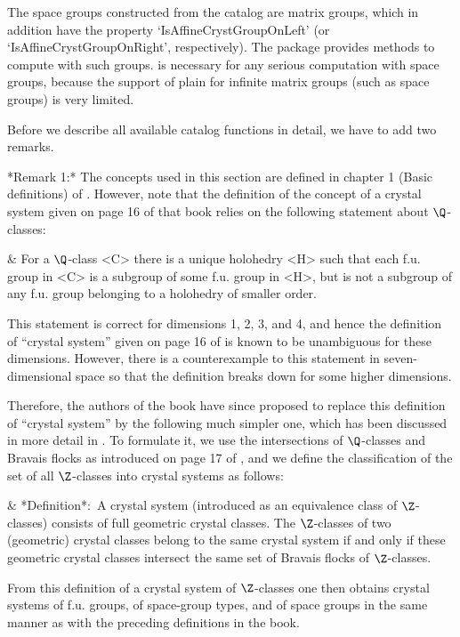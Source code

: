 The space groups constructed from the catalog are matrix groups, which
in addition have the property `IsAffineCrystGroupOnLeft' (or
`IsAffineCrystGroupOnRight', respectively). The package {\Cryst}
provides methods to compute with such groups. {\Cryst} is necessary
for any serious computation with space groups, because the support of
plain {\GAP} for infinite matrix groups (such as space groups) is very
limited.

Before we describe all available catalog functions in detail, we have
to add two remarks.

*Remark 1:*
The concepts  used  in  this section are   defined  in chapter 1   (Basic
definitions) of \cite{BBNWZ78}.  However, note that the definition of the
concept of a crystal system given on page  16 of that  book relies on the
following statement about $\Q$-classes:

\beginitems
& For a  $\Q$-class  <C>  there is a unique holohedry <H> such that
  each  f.u. group in <C>  is a subgroup of some  f.u. group in
  <H>,  but is not  a subgroup of any  f.u. group  belonging to a
  holohedry of smaller order.
\enditems

This  statement is correct for  dimensions 1, 2,  3, and 4, and hence the
definition of ``crystal system'' given on page 16 of \cite{BBNWZ78} is
known  to   be unambiguous for   these  dimensions.  However, there  is a
counterexample to  this statement in seven-dimensional  space so that the
definition breaks down for some higher dimensions.

Therefore,  the authors of  the book have  since proposed to replace this
definition of ``crystal system''  by the  following much simpler  one,
which has been discussed in more detail in \cite{NPW81}. To formulate it,
we use    the   intersections  of $\Q$-classes    and  Bravais  flocks as
introduced on page 17 of \cite{BBNWZ78}, and we define the classification
of the set of all $\Z$-classes into crystal systems as follows:

\beginitems
& *Definition*:\  A crystal system  (introduced as an  equivalence
  class  of   $\Z$-classes)   consists of  full  geometric  crystal
  classes.  The $\Z$-classes  of  two  (geometric)  crystal classes
  belong to the same crystal system  if and only if these geometric
  crystal  classes  intersect  the same  set of  Bravais  flocks of
  $\Z$-classes.
\enditems

From  this  definition  of  a  crystal system  of  $\Z$-classes  one then
obtains  crystal systems of f.u.  groups,  of space-group types, and of
space groups in the same manner as with the  preceding definitions in the
book.

